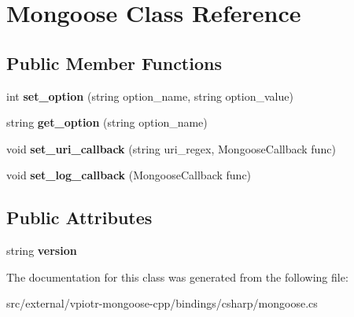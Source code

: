 \hypertarget{class_mongoose}{\section{Mongoose Class Reference}
\label{class_mongoose}
}
\subsection*{Public Member Functions}
\begin{DoxyCompactItemize}
\item 
\hypertarget{class_mongoose_a6faf5142a83799767b1b047c72cf166d}{int {\bfseries set\-\_\-option} (string option\-\_\-name, string option\-\_\-value)}\label{class_mongoose_a6faf5142a83799767b1b047c72cf166d}

\item 
\hypertarget{class_mongoose_a5575e630535f24c1a51fdd3575517b68}{string {\bfseries get\-\_\-option} (string option\-\_\-name)}\label{class_mongoose_a5575e630535f24c1a51fdd3575517b68}

\item 
\hypertarget{class_mongoose_a5eee2d793dcdad22d0d5ebdf2230db3a}{void {\bfseries set\-\_\-uri\-\_\-callback} (string uri\-\_\-regex, Mongoose\-Callback func)}\label{class_mongoose_a5eee2d793dcdad22d0d5ebdf2230db3a}

\item 
\hypertarget{class_mongoose_ac5e4299b43815dd43d6e9c0d97a05275}{void {\bfseries set\-\_\-log\-\_\-callback} (Mongoose\-Callback func)}\label{class_mongoose_ac5e4299b43815dd43d6e9c0d97a05275}

\end{DoxyCompactItemize}
\subsection*{Public Attributes}
\begin{DoxyCompactItemize}
\item 
\hypertarget{class_mongoose_a344dc767f800d7cea222e5f21b1470fe}{string {\bfseries version}}\label{class_mongoose_a344dc767f800d7cea222e5f21b1470fe}

\end{DoxyCompactItemize}


The documentation for this class was generated from the following file\-:\begin{DoxyCompactItemize}
\item 
src/external/vpiotr-\/mongoose-\/cpp/bindings/csharp/mongoose.\-cs\end{DoxyCompactItemize}
